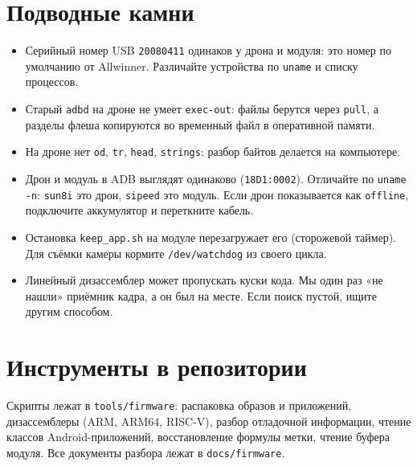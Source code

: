 \section{Подводные камни}

\begin{itemize}
  \item Серийный номер USB \texttt{20080411} одинаков у дрона и модуля: это номер по умолчанию от Allwinner. Различайте устройства по \texttt{uname} и списку процессов.
  \item Старый \texttt{adbd} на дроне не умеет \texttt{exec-out}: файлы берутся через \texttt{pull}, а разделы флеша копируются во временный файл в оперативной памяти.
  \item На дроне нет \texttt{od}, \texttt{tr}, \texttt{head}, \texttt{strings}: разбор байтов делается на компьютере.
  \item Дрон и модуль в ADB выглядят одинаково (\texttt{18D1:0002}). Отличайте по \texttt{uname -n}: \texttt{sun8i} это дрон, \texttt{sipeed} это модуль. Если дрон показывается как \texttt{offline}, подключите аккумулятор и переткните кабель.
  \item Остановка \texttt{keep\_app.sh} на модуле перезагружает его (сторожевой таймер). Для съёмки камеры кормите \texttt{/dev/watchdog} из своего цикла.
  \item Линейный дизассемблер может пропускать куски кода. Мы один раз «не нашли» приёмник кадра, а он был на месте. Если поиск пустой, ищите другим способом.
\end{itemize}

\section{Инструменты в репозитории}

Скрипты лежат в \texttt{tools/firmware}: распаковка образов и приложений, дизассемблеры (ARM, ARM64, RISC-V), разбор отладочной информации, чтение классов Android-приложений, восстановление формулы метки, чтение буфера модуля. Все документы разбора лежат в \texttt{docs/firmware}. \pr{}
